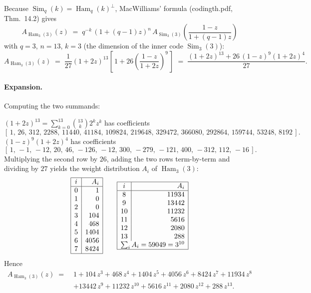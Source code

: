 \documentclass[11pt,a4paper]{article}
\newcommand{\Ham}{\operatorname{Ham}}
\newcommand{\Sim}{\operatorname{Sim}}
\begin{document}
Because $\Sim_q(k)=\Ham_q(k)^{\perp}$, MacWilliams' formula (codingth.pdf, Thm.~14.2) gives
\[
A_{\Ham_3(3)}(z)
\;=\; q^{-k}\,(1+(q-1)z)^{n}\,A_{\Sim_3(3)}\!\!\left(\frac{1-z}{1+(q-1)z}\right)
\]
with $q=3$, $n=13$, $k=3$ (the dimension of the inner code $\Sim_3(3)$):
\[
A_{\Ham_3(3)}(z)
\;=\;\frac{1}{27}(1+2z)^{13}\!\left[\,1+26\!\left(\frac{1-z}{1+2z}\right)^{\!9}\,\right]
\;=\;\frac{(1+2z)^{13}+26\,(1-z)^{9}(1+2z)^{4}}{27}.
\]

\paragraph{Expansion.} Computing the two summands:

\smallskip
\noindent$(1+2z)^{13}=\sum_{k=0}^{13}\binom{13}{k}2^{k}z^{k}$ has coefficients
\[
[\,1,\,26,\,312,\,2288,\,11440,\,41184,\,109824,\,219648,\,329472,\,366080,\,292864,\,159744,\,53248,\,8192\,].
\]
$(1-z)^{9}(1+2z)^{4}$ has coefficients
\[
[\,1,\,-1,\,-12,\,20,\,46,\,-126,\,-12,\,300,\,-279,\,-121,\,400,\,-312,\,112,\,-16\,].
\]
Multiplying the second row by $26$, adding the two rows term-by-term and dividing by $27$ yields the weight distribution $A_{i}$ of $\Ham_3(3)$:
\[
\begin{array}{|c|r|}\hline
 i & A_{i} \\\hline
 0 & 1 \\
 1 & 0 \\
 2 & 0 \\
 3 & 104 \\
 4 & 468 \\
 5 & 1404 \\
 6 & 4056 \\
 7 & 8424 \\\hline
\end{array}\qquad
\begin{array}{|c|r|}\hline
 i & A_{i}\\\hline
 8 & 11934\\
 9 & 13442\\
 10 & 11232\\
 11 & 5616\\
 12 & 2080\\
 13 & 288\\
 \multicolumn{2}{|c|}{\sum_i A_i = 59049 = 3^{10}}\\\hline
\end{array}
\]
Hence
\[
\boxed{
\begin{aligned}
A_{\Ham_3(3)}(z)\;=\;& 1 + 104\,z^{3} + 468\,z^{4} + 1404\,z^{5} + 4056\,z^{6} + 8424\,z^{7} + 11934\,z^{8}\\
& + 13442\,z^{9} + 11232\,z^{10} + 5616\,z^{11} + 2080\,z^{12} + 288\,z^{13}.
\end{aligned}}
\]
\end{document}
